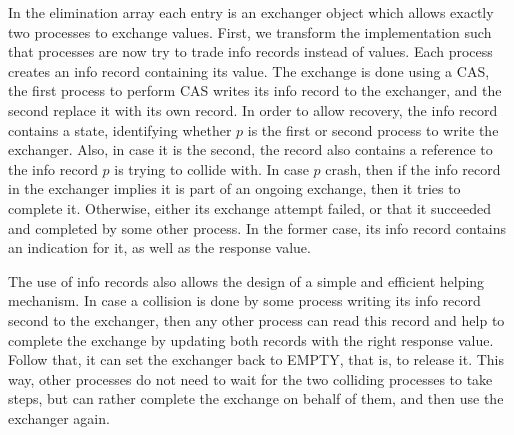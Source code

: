 In the elimination array each entry is an exchanger object which allows exactly two processes to exchange values. First, we transform the implementation such that processes are now try to trade info records instead of values. Each process creates an info record containing its value. The exchange is done using a CAS, the first process to perform CAS writes its info record to the exchanger, and the second replace it with its own record. In order to allow recovery, the info record contains a state, identifying whether $p$ is the first or second process to write the exchanger. Also, in case it is the second, the record also contains a reference to the info record $p$ is trying to collide with. In case $p$ crash, then if the info record in the exchanger implies it is part of an ongoing exchange, then it tries to complete it. Otherwise, either its exchange attempt failed, or that it succeeded and completed by some other process. In the former case, its info record contains an indication for it, as well as the response value.

The use of info records also allows the design of a simple and efficient helping mechanism. In case a collision is done by some process writing its info record second to the exchanger, then any other process can read this record and help to complete the exchange by updating both records with the right response value. Follow that, it can set the exchanger back to EMPTY, that is, to release it. This way, other processes do not need to wait for the two colliding processes to take steps, but can rather complete the exchange on behalf of them, and then use the exchanger again.
